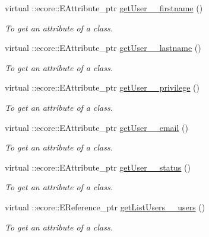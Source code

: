 \begin{DoxyCompactItemize}
virtual ::ecore::EAttribute\_\-ptr \hyperlink{classUMS__Data_1_1UMS__DataPackage_a1285df6b8c62a641345b8d9bc914549e}{getUser\_\-\_\-firstname} ()
\begin{DoxyCompactList}\small\item\em To get an attribute of a class. \item\end{DoxyCompactList}\item 
virtual ::ecore::EAttribute\_\-ptr \hyperlink{classUMS__Data_1_1UMS__DataPackage_a0d16f2e9016267eb67b247b52a937aad}{getUser\_\-\_\-lastname} ()
\begin{DoxyCompactList}\small\item\em To get an attribute of a class. \item\end{DoxyCompactList}\item 
virtual ::ecore::EAttribute\_\-ptr \hyperlink{classUMS__Data_1_1UMS__DataPackage_a7550586ca431c7183184262a4de8fa20}{getUser\_\-\_\-privilege} ()
\begin{DoxyCompactList}\small\item\em To get an attribute of a class. \item\end{DoxyCompactList}\item 
virtual ::ecore::EAttribute\_\-ptr \hyperlink{classUMS__Data_1_1UMS__DataPackage_a3ea0c51655cc8071171430c42d549b8d}{getUser\_\-\_\-email} ()
\begin{DoxyCompactList}\small\item\em To get an attribute of a class. \item\end{DoxyCompactList}\item 
virtual ::ecore::EAttribute\_\-ptr \hyperlink{classUMS__Data_1_1UMS__DataPackage_a48eda07f3cea09cdff01021110d63684}{getUser\_\-\_\-status} ()
\begin{DoxyCompactList}\small\item\em To get an attribute of a class. \item\end{DoxyCompactList}\item 
virtual ::ecore::EReference\_\-ptr \hyperlink{classUMS__Data_1_1UMS__DataPackage_a40e00b5b6e9e3de6a00c2dbc5fad2d06}{getListUsers\_\-\_\-users} ()
\begin{DoxyCompactList}\small\item\em To get an attribute of a class. \item\end{DoxyCompactList}\item 

\end{DoxyCompactItemize}
